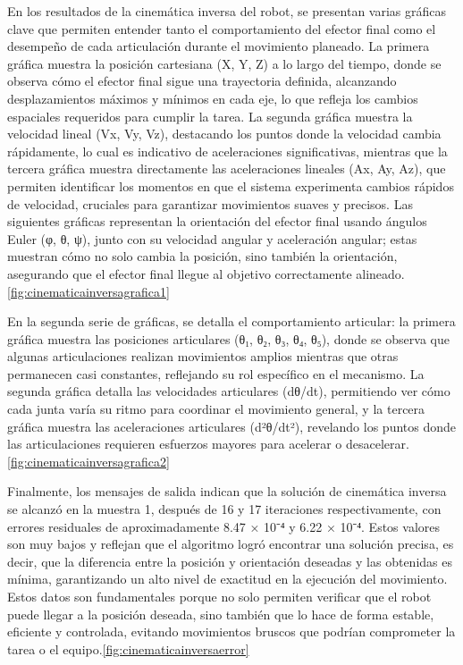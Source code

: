 En los resultados de la cinemática inversa del robot, se presentan varias gráficas clave que permiten entender tanto el comportamiento del efector final como el desempeño de cada articulación durante el movimiento planeado. La primera gráfica muestra la posición cartesiana (X, Y, Z) a lo largo del tiempo, donde se observa cómo el efector final sigue una trayectoria definida, alcanzando desplazamientos máximos y mínimos en cada eje, lo que refleja los cambios espaciales requeridos para cumplir la tarea. La segunda gráfica muestra la velocidad lineal (Vx, Vy, Vz), destacando los puntos donde la velocidad cambia rápidamente, lo cual es indicativo de aceleraciones significativas, mientras que la tercera gráfica muestra directamente las aceleraciones lineales (Ax, Ay, Az), que permiten identificar los momentos en que el sistema experimenta cambios rápidos de velocidad, cruciales para garantizar movimientos suaves y precisos. Las siguientes gráficas representan la orientación del efector final usando ángulos Euler (φ, θ, ψ), junto con su velocidad angular y aceleración angular; estas muestran cómo no solo cambia la posición, sino también la orientación, asegurando que el efector final llegue al objetivo correctamente alineado. \autoref{fig:cinematicainversagrafica1}

En la segunda serie de gráficas, se detalla el comportamiento articular: la primera gráfica muestra las posiciones articulares (θ₁, θ₂, θ₃, θ₄, θ₅), donde se observa que algunas articulaciones realizan movimientos amplios mientras que otras permanecen casi constantes, reflejando su rol específico en el mecanismo. La segunda gráfica detalla las velocidades articulares (dθ/dt), permitiendo ver cómo cada junta varía su ritmo para coordinar el movimiento general, y la tercera gráfica muestra las aceleraciones articulares (d²θ/dt²), revelando los puntos donde las articulaciones requieren esfuerzos mayores para acelerar o desacelerar. \autoref{fig:cinematicainversagrafica2}

Finalmente, los mensajes de salida indican que la solución de cinemática inversa se alcanzó en la muestra 1, después de 16 y 17 iteraciones respectivamente, con errores residuales de aproximadamente 8.47 × 10⁻⁴ y 6.22 × 10⁻⁴. Estos valores son muy bajos y reflejan que el algoritmo logró encontrar una solución precisa, es decir, que la diferencia entre la posición y orientación deseadas y las obtenidas es mínima, garantizando un alto nivel de exactitud en la ejecución del movimiento. Estos datos son fundamentales porque no solo permiten verificar que el robot puede llegar a la posición deseada, sino también que lo hace de forma estable, eficiente y controlada, evitando movimientos bruscos que podrían comprometer la tarea o el equipo.\autoref{fig:cinematicainversaerror}

